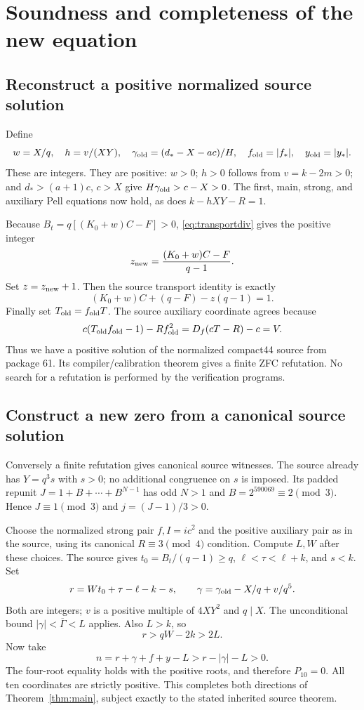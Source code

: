 \documentclass[11pt]{article}
\theoremstyle{remark}
\begin{document}
\section{Soundness and completeness of the new equation}

\subsection{Reconstruct a positive normalized source solution}
Define
\[
 w=X/q,\quad h=v/(XY),\quad
 \gamma_{\rm old}=(d_*-X-ac)/H,
 \quad f_{\rm old}=|f_*|,\quad y_{\rm old}=|y_*|.
\]
These are integers. They are positive: $w>0$; $h>0$ follows from
$v=k-2m>0$; and $d_*>(a+1)c$, $c>X$ give
$H\gamma_{\rm old}>c-X>0$.
The first, main, strong, and auxiliary Pell equations now hold, as does
$k-hXY-R=1$.

Because $B_t=q[(K_0+w)C-F]>0$, \eqref{eq:transportdiv} gives the
positive integer
\[
 z_{\rm new}=\frac{(K_0+w)C-F}{q-1}.
\]
Set $z=z_{\rm new}+1$. Then the source transport identity is exactly
\[
 (K_0+w)C+(q-F)-z(q-1)=1.
\]
Finally set $T_{\rm old}=f_{\rm old}T$. The source auxiliary coordinate
agrees because
\[
 c(T_{\rm old}f_{\rm old}-1)-Rf_{\rm old}^2
 =D_f(cT-R)-c=V.
\]
Thus we have a positive solution of the normalized compact44 source from
package 61. Its compiler/calibration theorem gives a finite ZFC refutation.
No search for a refutation is performed by the verification programs.

\subsection{Construct a new zero from a canonical source solution}
Conversely a finite refutation gives canonical source witnesses. The
source already has $Y=q^3s$ with $s>0$; no additional congruence on $s$
is imposed. Its padded repunit $J=1+B+\cdots+B^{N-1}$ has odd $N>1$
and $B=2^{590069}\equiv2\pmod3$. Hence $J\equiv1\pmod3$ and
$j=(J-1)/3>0$.

Choose the normalized strong pair $f,I=ic^2$ and the positive auxiliary
pair as in the source, using its canonical $R\equiv3\pmod4$ condition.
Compute $L,W$ after these choices. The source
gives $t_0=B_t/(q-1)\ge q$, $\ell<\tau<\ell+k$, and $s<k$.
Set
\[
 r=Wt_0+\tau-\ell-k-s,
 \qquad
 \gamma=\gamma_{\rm old}-X/q+v/q^5.
\]
Both are integers; $v$ is a positive multiple of $4XY^2$ and $q\mid X$.
The unconditional bound $|\gamma|<\overline\Gamma<L$ applies.
Also $L>k$, so
\[
 r>qW-2k>2L.
\]
Now take
\[
 n=r+\gamma+f+y-L>r-|\gamma|-L>0.
\]
The four-root equality holds with the positive roots, and therefore
$P_{10}=0$. All ten coordinates are strictly positive. This completes
both directions of Theorem~\ref{thm:main}, subject exactly to the stated
inherited source theorem.
\end{document}
